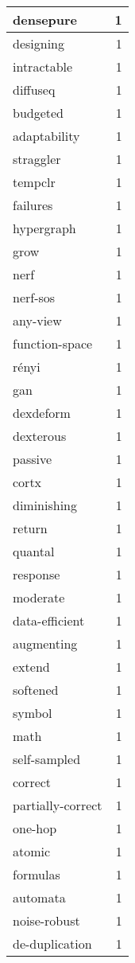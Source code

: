 \begin{table}[h]
\begin{tabular}{|l|r|}
\hline
densepure & 1 \\
\hline
designing & 1 \\
\hline
intractable & 1 \\
\hline
diffuseq & 1 \\
\hline
budgeted & 1 \\
\hline
adaptability & 1 \\
\hline
straggler & 1 \\
\hline
tempclr & 1 \\
\hline
failures & 1 \\
\hline
hypergraph & 1 \\
\hline
grow & 1 \\
\hline
nerf & 1 \\
\hline
nerf-sos & 1 \\
\hline
any-view & 1 \\
\hline
function-space & 1 \\
\hline
rényi & 1 \\
\hline
gan & 1 \\
\hline
dexdeform & 1 \\
\hline
dexterous & 1 \\
\hline
passive & 1 \\
\hline
cortx & 1 \\
\hline
diminishing & 1 \\
\hline
return & 1 \\
\hline
quantal & 1 \\
\hline
response & 1 \\
\hline
moderate & 1 \\
\hline
data-efficient & 1 \\
\hline
augmenting & 1 \\
\hline
extend & 1 \\
\hline
softened & 1 \\
\hline
symbol & 1 \\
\hline
math & 1 \\
\hline
self-sampled & 1 \\
\hline
correct & 1 \\
\hline
partially-correct & 1 \\
\hline
one-hop & 1 \\
\hline
atomic & 1 \\
\hline
formulas & 1 \\
\hline
automata & 1 \\
\hline
noise-robust & 1 \\
\hline
de-duplication & 1 \\

\end{tabular}
\end{table}

